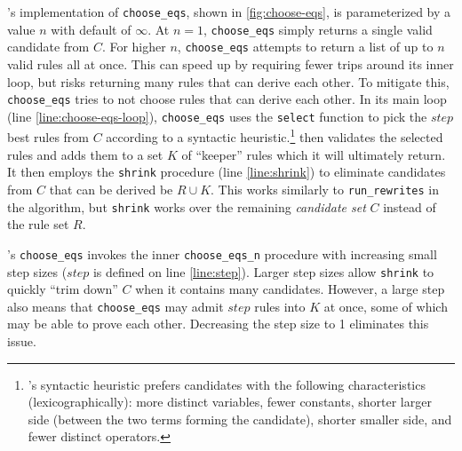's implementation of
 \lstinline{choose_eqs}, shown in \autoref{fig:choose-eqs},
 is parameterized by a value $n$ with default of $\infty$.
At $n=1$, \lstinline{choose_eqs} simply returns a single valid candidate from $C$.
For higher $n$, \lstinline{choose_eqs}
 attempts to return a list of up to $n$ valid rules all at once.
This can speed up  by requiring fewer trips around its inner loop,
 but risks returning many rules that can derive each other.
To mitigate this, \lstinline{choose_eqs} tries to not
 choose rules that can derive each other.
In its main loop (line \autoref{line:choose-eqs-loop}),
 \lstinline{choose_eqs}
 uses the \lstinline{select} function to pick the $\mathit{step}$
 best rules from $C$ according to a syntactic heuristic.\footnote{
 \Ruler's syntactic heuristic prefers candidates
  with the following characteristics (lexicographically):
 more distinct variables,
 fewer constants,
 shorter larger side (between the two terms forming the candidate),
 shorter smaller side,
 and fewer distinct operators.
}
\Ruler then validates the selected rules
 and adds them to a set $K$ of ``keeper'' rules which it will ultimately return.
It then employs the
 \lstinline{shrink} procedure (line \autoref{line:shrink})
 to eliminate candidates from $C$ that can be derived be $R \cup K$.
This works similarly to
 \lstinline{run_rewrites} in the  algorithm,
 but \lstinline{shrink} works over the remaining
 \textit{candidate set} $C$ instead of the rule set $R$.

's \lstinline{choose_eqs} invokes the inner
 \lstinline{choose_eqs_n} procedure with increasing small step sizes
 ($\mathit{step}$ is defined on line \ref{line:step}).
Larger step sizes allow \lstinline{shrink} to quickly
 ``trim down'' $C$ when it contains many candidates.
However, a large step also means that
 \lstinline{choose_eqs} may admit $\mathit{step}$ rules into $K$ at once,
 some of which may be able to prove each other.
Decreasing the step size to 1 eliminates this issue.











